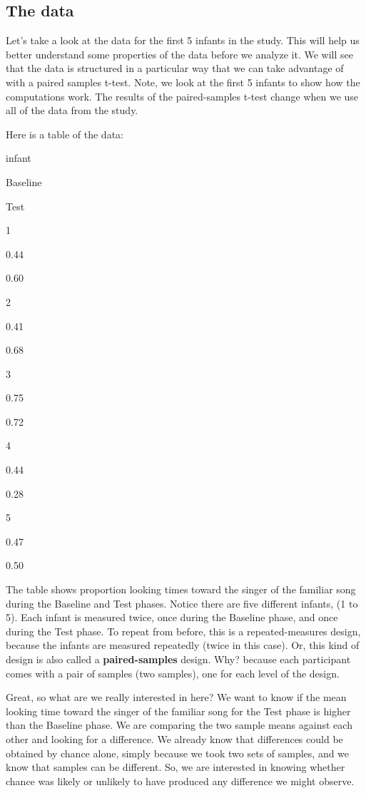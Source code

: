 \documentclass[]{book}
\begin{document}
\hypertarget{the-data}{%
\subsection{The data}\label{the-data}}

Let's take a look at the data for the first 5 infants in the study. This will help us better understand some properties of the data before we analyze it. We will see that the data is structured in a particular way that we can take advantage of with a paired samples t-test. Note, we look at the first 5 infants to show how the computations work. The results of the paired-samples t-test change when we use all of the data from the study.

Here is a table of the data:

infant

Baseline

Test

1

0.44

0.60

2

0.41

0.68

3

0.75

0.72

4

0.44

0.28

5

0.47

0.50

The table shows proportion looking times toward the singer of the familiar song during the Baseline and Test phases. Notice there are five different infants, (1 to 5). Each infant is measured twice, once during the Baseline phase, and once during the Test phase. To repeat from before, this is a repeated-measures design, because the infants are measured repeatedly (twice in this case). Or, this kind of design is also called a \textbf{paired-samples} design. Why? because each participant comes with a pair of samples (two samples), one for each level of the design.

Great, so what are we really interested in here? We want to know if the mean looking time toward the singer of the familiar song for the Test phase is higher than the Baseline phase. We are comparing the two sample means against each other and looking for a difference. We already know that differences could be obtained by chance alone, simply because we took two sets of samples, and we know that samples can be different. So, we are interested in knowing whether chance was likely or unlikely to have produced any difference we might observe.
\end{document}
